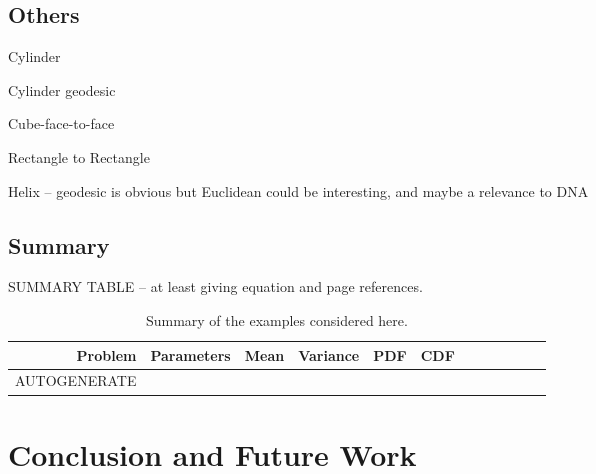 \documentclass{article}
\begin{document}
\clearpage


\clearpage


\clearpage


\clearpage


\clearpage


\clearpage


\clearpage


\clearpage


\clearpage


\clearpage


\clearpage


\clearpage


\clearpage
\subsection{Others}

Cylinder

Cylinder geodesic

Cube-face-to-face

Rectangle to Rectangle

Helix -- geodesic is obvious but Euclidean could be interesting, and
maybe a relevance to DNA
 
\clearpage
\subsection{Summary}
SUMMARY TABLE -- at least giving equation and page references.

\begin{table}[ht]
  \centering
  \begin{tabular}{r|lllllllllll}
    Problem & Parameters & Mean & Variance & PDF & CDF \\
    \hline
    AUTOGENERATE
  \end{tabular}
  \caption{Summary of the examples considered here.}
  \label{tab:summary}
\end{table}

\clearpage


\clearpage


\clearpage


\clearpage



\clearpage
\section{Conclusion and Future Work}




\setlength{\parskip}{1mm}


% 
\end{document}
